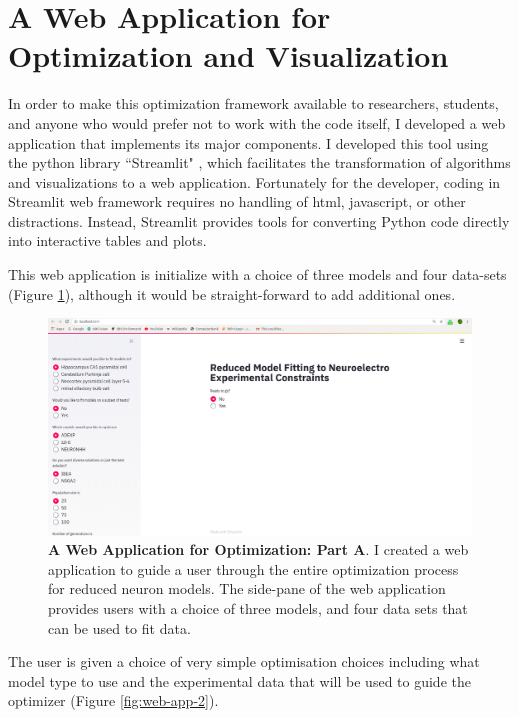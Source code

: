 \section{A Web Application for Optimization and Visualization}
\label{sec:web-app}
In order to make this optimization framework available to researchers, students, and anyone who would prefer not to work with the code itself, I developed a web application that implements its major components.
I developed this tool using the python library ``Streamlit" \citep{streamlit}, which facilitates the transformation of algorithms and visualizations to a web application.
Fortunately for the developer, coding in Streamlit web framework requires no handling of html, javascript, or other distractions.
Instead, Streamlit provides tools for converting Python code directly into interactive tables and plots.

This web application is initialize with a choice of three models and four data-sets (Figure \ref{fig:web-app-1}), although it would be straight-forward to add additional ones.

\begin{figure}
\begin{center}
\includegraphics[scale=1]{chapters/app_tex/web_app_thesis}
\end{center}
\caption[Web Application (1)]{\textbf{A Web Application for Optimization: Part A}.
I created a web application to guide a user through the entire optimization process for reduced neuron models.
The side-pane of the web application provides users with a choice of three models, and four data sets that can be used to fit data.
}
\label{fig:web-app-1}
\end{figure}

The user is given a choice of very simple optimisation choices including what model type to use and the experimental data that will be used to guide the optimizer (Figure \ref{fig:web-app-2}).

